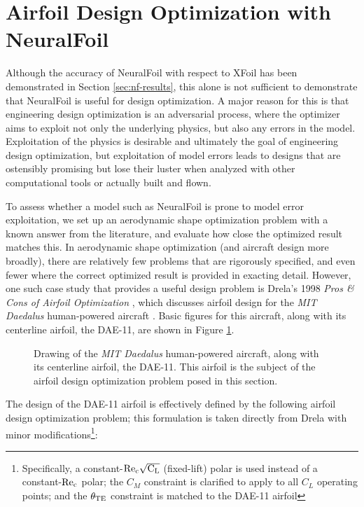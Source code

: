 \section{Airfoil Design Optimization with NeuralFoil}
\label{sec:optimization}

Although the accuracy of NeuralFoil with respect to XFoil has been demonstrated in Section \ref{sec:nf-results}, this alone is not sufficient to demonstrate that NeuralFoil is useful for design optimization. A major reason for this is that engineering design optimization is an adversarial process, where the optimizer aims to exploit not only the underlying physics, but also any errors in the model. Exploitation of the physics is desirable and ultimately the goal of engineering design optimization, but exploitation of model errors leads to designs that are ostensibly promising but lose their luster when analyzed with other computational tools or actually built and flown.

To assess whether a model such as NeuralFoil is prone to model error exploitation, we set up an aerodynamic shape optimization problem with a known answer from the literature, and evaluate how close the optimized result matches this. In aerodynamic shape optimization (and aircraft design more broadly), there are relatively few problems that are rigorously specified, and even fewer where the correct optimized result is provided in exacting detail. However, one such case study that provides a useful design problem is Drela's 1998 \textit{Pros \& Cons of Airfoil Optimization} \cite{drela_pros_1998}, which discusses airfoil design for the \emph{MIT Daedalus} human-powered aircraft \cite{langford_feasibility_1986, langford_daedalus_1989, drela_humanpowered_1985}. Basic figures for this aircraft, along with its centerline airfoil, the DAE-11, are shown in Figure \ref{fig:daedalus_iso}.

\begin{figure}[H]
    \centering
    
    \caption{Drawing of the \emph{MIT Daedalus} human-powered aircraft, along with its centerline airfoil, the DAE-11. This airfoil is the subject of the airfoil design optimization problem posed in this section.}
    \label{fig:daedalus_iso}
\end{figure}

The design of the DAE-11 airfoil is effectively defined by the following airfoil design optimization problem; this formulation is taken directly from Drela \cite{drela_pros_1998} with minor modifications\footnote{Specifically, a constant-$\rm Re_c \sqrt{C_L}$ (fixed-lift) polar is used instead of a constant-$\rm Re_c$ polar; the $C_M$ constraint is clarified to apply to all $C_L$ operating points; and the $\theta_{\rm TE}$ constraint is matched to the DAE-11 airfoil}:


